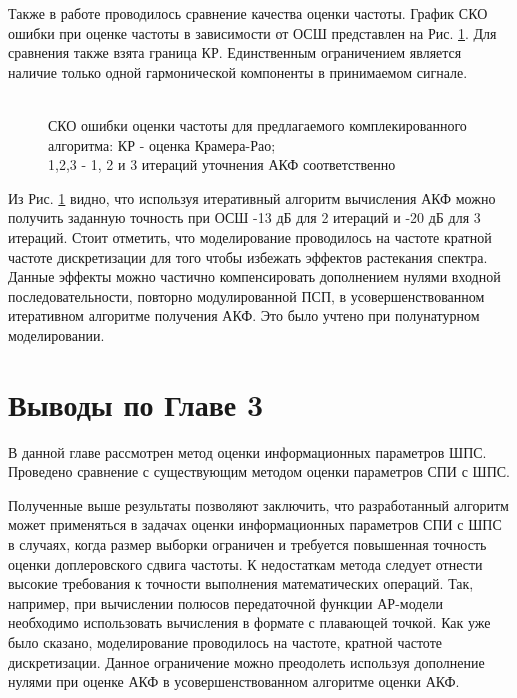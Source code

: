 Также в работе проводилось сравнение качества оценки частоты. График СКО ошибки при оценке частоты в зависимости от ОСШ представлен на Рис. \ref{pic:crlb_vs_algorithm}.
Для сравнения также взята граница КР.  Единственным ограничением является наличие только одной гармонической компоненты в принимаемом сигнале.
\begin{figure}[h]
\center{}
	\caption{\\СКО ошибки оценки частоты для предлагаемого комплекированного алгоритма: КР - оценка Крамера-Рао; \\1,2,3 - 1, 2 и 3 итераций уточнения АКФ соответственно}
	\label{pic:crlb_vs_algorithm}
\end{figure}
Из Рис. \ref{pic:crlb_vs_algorithm} видно, что используя итеративный алгоритм вычисления АКФ можно получить заданную точность
при ОСШ -13 дБ для 2 итераций и -20 дБ для 3 итераций. Стоит отметить, что моделирование проводилось на частоте кратной частоте дискретизации для
того чтобы избежать эффектов растекания спектра. Данные эффекты можно частично компенсировать дополнением нулями входной последовательности, повторно модулированной ПСП, в
усовершенствованном итеративном алгоритме получения АКФ. Это было учтено при полунатурном моделировании.

\section{Выводы по Главе 3}

В данной главе рассмотрен метод оценки информационных параметров ШПС. Проведено сравнение с существующим методом оценки параметров СПИ с ШПС.

Полученные выше результаты позволяют заключить, что разработанный алгоритм может применяться в задачах оценки информационных параметров СПИ с ШПС в случаях, когда размер выборки ограничен и
требуется повышенная точность оценки доплеровского сдвига частоты. К недостаткам метода следует отнести высокие требования к точности выполнения математических операций.
Так, например, при вычислении полюсов передаточной функции АР-модели необходимо использовать вычисления в формате с плавающей точкой. 
Как уже было сказано, моделирование проводилось на частоте, кратной частоте дискретизации. Данное ограничение можно преодолеть используя дополнение нулями при оценке АКФ
в усовершенствованном алгоритме оценки АКФ.

